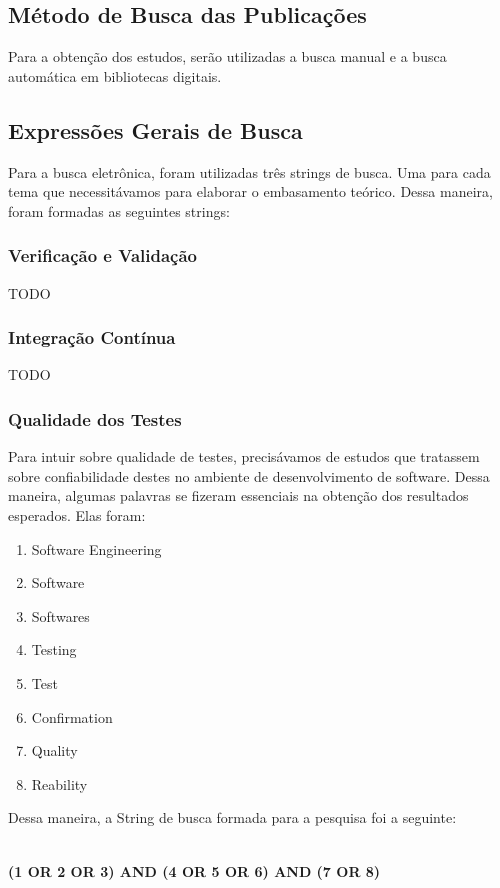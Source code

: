 \subsection{Método de Busca das Publicações}
\label{sub:Método de Busca das Publicações}
Para a obtenção dos estudos, serão utilizadas a busca manual e a busca
automática em bibliotecas digitais.

\subsection{Expressões Gerais de Busca}
\label{sub:Expressões Gerais de Busca}
Para a busca eletrônica, foram utilizadas três strings de busca.
Uma para cada tema que necessitávamos para elaborar o embasamento teórico.
Dessa maneira, foram formadas as seguintes strings:

\subsubsection{Verificação e Validação}
\label{sub:Verificação e Validação}
 TODO

\subsubsection{Integração Contínua}
\label{sub:Integração Contínua}
 TODO

\subsubsection{Qualidade dos Testes}
\label{sub:Qualidade dos Testes}
Para intuir sobre qualidade de testes, precisávamos de estudos que tratassem
sobre confiabilidade destes no ambiente de desenvolvimento de software. Dessa
maneira, algumas palavras se fizeram essenciais na obtenção dos resultados
esperados. Elas foram:

\begin{enumerate}
    \item Software Engineering
    \item Software
    \item Softwares
    \item Testing
    \item Test
    \item Confirmation
    \item Quality
    \item Reability
\end{enumerate}

Dessa maneira, a String de busca formada para a pesquisa foi a seguinte:
\\
\\
\centerline{\textbf{(1 OR 2 OR 3) AND (4 OR 5 OR 6) AND (7 OR 8)}}

